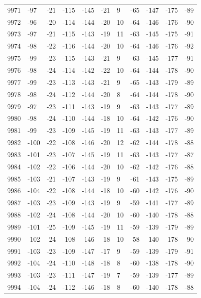 \begin{table}[H]
\begin{tabular}{lllllllllll}
9971 & -97 & -21 & -115 & -145 & -21 & 9 & -65 & -147 & -175 & -89 \\
9972 & -96 & -20 & -114 & -144 & -20 & 10 & -64 & -146 & -176 & -90 \\
9973 & -97 & -21 & -115 & -143 & -19 & 11 & -63 & -145 & -175 & -91 \\
9974 & -98 & -22 & -116 & -144 & -20 & 10 & -64 & -146 & -176 & -92 \\
9975 & -99 & -23 & -115 & -143 & -21 & 9 & -63 & -145 & -177 & -91 \\
9976 & -98 & -24 & -114 & -142 & -22 & 10 & -64 & -144 & -178 & -90 \\
9977 & -99 & -23 & -113 & -143 & -21 & 9 & -65 & -143 & -179 & -89 \\
9978 & -98 & -24 & -112 & -144 & -20 & 8 & -64 & -144 & -178 & -90 \\
9979 & -97 & -23 & -111 & -143 & -19 & 9 & -63 & -143 & -177 & -89 \\
9980 & -98 & -24 & -110 & -144 & -18 & 10 & -64 & -142 & -176 & -90 \\
9981 & -99 & -23 & -109 & -145 & -19 & 11 & -63 & -143 & -177 & -89 \\
9982 & -100 & -22 & -108 & -146 & -20 & 12 & -62 & -144 & -178 & -88 \\
9983 & -101 & -23 & -107 & -145 & -19 & 11 & -63 & -143 & -177 & -87 \\
9984 & -102 & -22 & -106 & -144 & -20 & 10 & -62 & -142 & -176 & -88 \\
9985 & -103 & -21 & -107 & -143 & -19 & 9 & -61 & -143 & -175 & -89 \\
9986 & -104 & -22 & -108 & -144 & -18 & 10 & -60 & -142 & -176 & -90 \\
9987 & -103 & -23 & -109 & -143 & -19 & 9 & -59 & -141 & -177 & -89 \\
9988 & -102 & -24 & -108 & -144 & -20 & 10 & -60 & -140 & -178 & -88 \\
9989 & -101 & -25 & -109 & -145 & -19 & 11 & -59 & -139 & -179 & -89 \\
9990 & -102 & -24 & -108 & -146 & -18 & 10 & -58 & -140 & -178 & -90 \\
9991 & -103 & -23 & -109 & -147 & -17 & 9 & -59 & -139 & -179 & -91 \\
9992 & -104 & -24 & -110 & -148 & -18 & 8 & -60 & -138 & -178 & -90 \\
9993 & -103 & -23 & -111 & -147 & -19 & 7 & -59 & -139 & -177 & -89 \\
9994 & -104 & -24 & -112 & -146 & -18 & 8 & -60 & -140 & -178 & -88 \\

\end{tabular}
\end{table}
